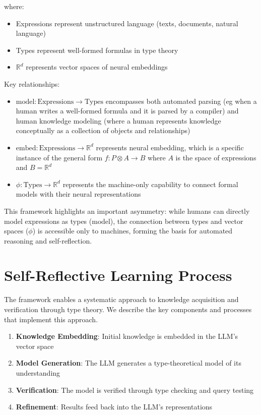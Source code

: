 \documentclass[11pt]{article}
\begin{document}
where:
\begin{itemize}
    \item Expressions represent unstructured language (texts, documents, natural language)
    \item Types represent well-formed formulas in type theory
    \item $\mathbb{R}^d$ represents vector spaces of neural embeddings
\end{itemize}

Key relationships:
\begin{itemize}
    \item $\text{model}: \text{Expressions} \rightarrow \text{Types}$ encompasses both automated parsing (eg when a human writes a well-formed formula and it is parsed by a compiler) and human knowledge modeling (where a human represents knowledge conceptually as a collection of objects and relationships)
    \item $\text{embed}: \text{Expressions} \rightarrow \mathbb{R}^d$ represents neural embedding, which is a specific instance of the general form $f : P \otimes A \rightarrow B$ where $A$ is the space of expressions and $B = \mathbb{R}^d$
    \item $\phi: \text{Types} \rightarrow \mathbb{R}^d$ represents the machine-only capability to connect formal models with their neural representations
\end{itemize}

This framework highlights an important asymmetry: while humans can directly model expressions as types ($\text{model}$), the connection between types and vector spaces ($\phi$) is accessible only to machines, forming the basis for automated reasoning and self-reflection.

\section{Self-Reflective Learning Process}

The framework enables a systematic approach to knowledge acquisition and verification through type theory. We describe the key components and processes that implement this approach.
\begin{enumerate}
    \item \textbf{Knowledge Embedding}: Initial knowledge is embedded in the LLM's vector space
    \item \textbf{Model Generation}: The LLM generates a type-theoretical model of its understanding
    \item \textbf{Verification}: The model is verified through type checking and query testing
    \item \textbf{Refinement}: Results feed back into the LLM's representations
\end{enumerate}
\end{document}
